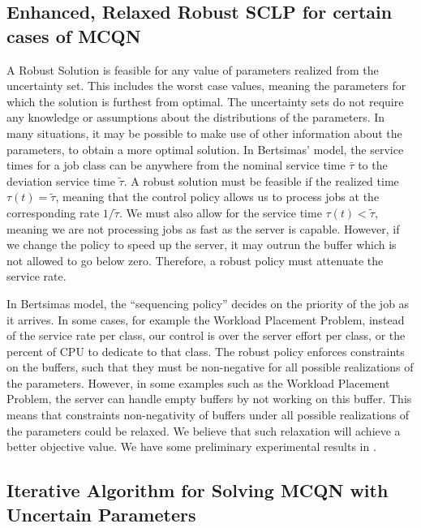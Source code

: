 \documentclass[11pt,a4paper,titlepage]{article}
\theoremstyle{definition}
\theoremstyle{plain}
\begin{document}
\subsection{Enhanced, Relaxed Robust SCLP for certain cases of MCQN}
\label{subsec:topics:enhanced-robust-sclp}

A Robust Solution is feasible for any value of parameters realized from the
uncertainty set.
This includes the worst case values,
meaning the parameters for which the solution is furthest from optimal.
The uncertainty sets do not require any knowledge or assumptions about the distributions of the parameters.
In many situations,
it may be possible to make use of other information about the parameters,
to obtain a more optimal solution.
In Bertsimas' model,
the service times for a job class can be anywhere from the nominal service time $\bar{\tau}$
to the deviation service time $\tilde{\tau}$.
A robust solution must be feasible if the realized time $\tau(t)=\tilde{\tau}$,
meaning that the control policy allows us to process jobs at the corresponding rate $1/\tilde{\tau}$.
We must also allow for the service time $\tau(t) < \tilde{\tau}$,
meaning we are not processing jobs as fast as the server is capable.
However,
if we change the policy to speed up the server,
it may outrun the buffer which is not allowed to go below zero.
Therefore,
a robust policy must attenuate the service rate.

In Bertsimas model,
the ``sequencing policy'' decides on the priority of the job as it arrives.
In some cases,
for example the Workload Placement Problem,
instead of the service rate per class,
our control is over the server effort per class,
or the percent of CPU to dedicate to that class.
The robust policy enforces constraints on the buffers,
such that they must be non-negative for all possible realizations of the parameters.
However,
in some examples such as the Workload Placement Problem,
the server can handle empty buffers by not working on this buffer.
This means that constraints non-negativity of buffers under all possible realizations of the parameters could be relaxed.
We believe that such relaxation will achieve a better objective value.
We have some preliminary experimental results in .


\subsection{Iterative Algorithm for Solving MCQN with Uncertain Parameters}
\label{subsec:topics:iterative}
\end{document}
